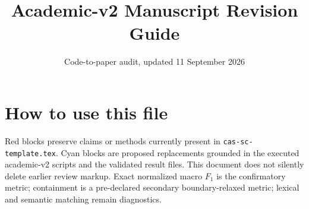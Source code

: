 \documentclass[11pt,a4paper]{article}
\title{Academic-v2 Manuscript Revision Guide}
\author{Code-to-paper audit, updated 11 September 2026}
\date{}
\newcommand{\Code}[1]{\texttt{#1}}
\begin{document}
\maketitle

\section*{How to use this file}
Red blocks preserve claims or methods currently present in
\Code{cas-sc-template.tex}. Cyan blocks are proposed replacements grounded in
the executed academic-v2 scripts and the validated result files. This document
does not silently delete earlier review markup. Exact normalized macro $F_1$ is
the confirmatory metric; containment is a pre-declared secondary boundary-relaxed
metric; lexical and semantic matching remain diagnostics.
\end{document}
